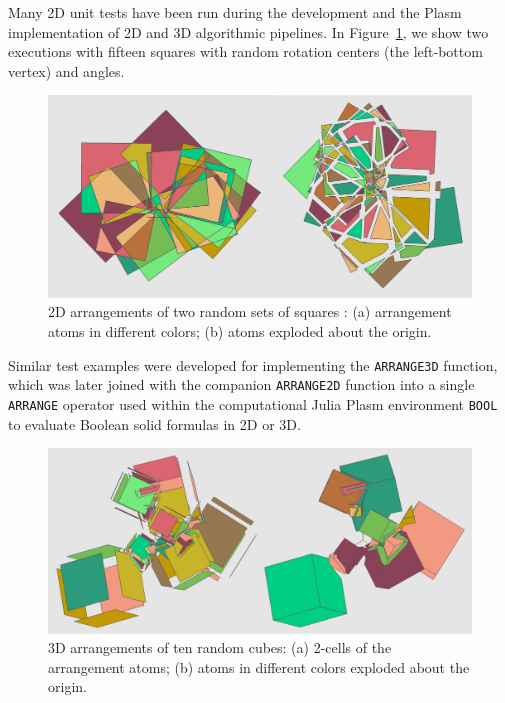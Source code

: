 \documentclass{juliacon}
\begin{document}
Many 2D unit tests have been run during the development and the Plasm implementation of 2D and 3D algorithmic pipelines. In Figure~\ref{fig:6:4:arrange2d}, we show two executions with fifteen squares with random rotation centers (the left-bottom vertex) and angles.
	\begin{figure}[htbp]  \centering
		\includegraphics[width=\linewidth]{figs/arrange2d}
		\caption{2D arrangements of two random sets of squares : (a) arrangement atoms in different colors; 
		(b) atoms exploded about the origin.}
		\label{fig:6:4:arrange2d}
	\end{figure}

Similar test examples were developed for implementing the {\tt ARRANGE3D} function, which was later joined with the companion {\tt ARRANGE2D} function into a single {\tt ARRANGE} operator used within the computational Julia Plasm environment {\tt BOOL} to evaluate Boolean solid formulas in 2D or 3D. 

\begin{figure}[htbp]  \centering
	\includegraphics[width=\linewidth]{figs/arrange3d}
	\caption{3D arrangements of ten random cubes: (a) 2-cells of the arrangement atoms; (b) atoms in different colors exploded about the origin.}
	\label{fig:6:4:arrange3d}
\end{figure}
\end{document}
